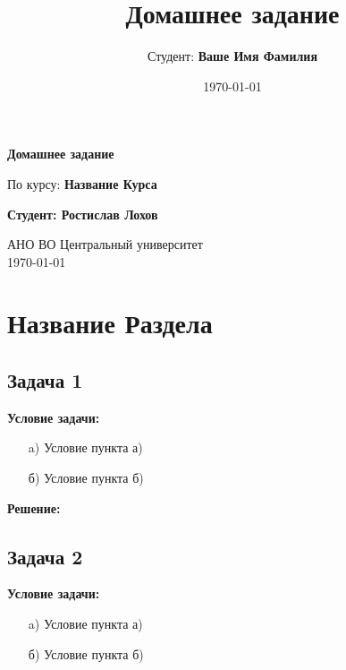 \documentclass[a4paper,12pt]{article}
\title{Домашнее задание}
\author{Студент: \textbf{Ваше Имя Фамилия}}
\date{\today}
\begin{document}
\begin{titlepage}
    \centering
    \vspace*{1cm}

    \Huge
    \textbf{Домашнее задание}

    \vspace{0.5cm}
    \LARGE
    По курсу: \textbf{Название Курса}

    \vspace{1.5cm}

    \textbf{Студент: Ростислав Лохов}

    \vfill

    \Large
    АНО ВО Центральный университет\\
    \vspace{0.3cm}
    \today

\end{titlepage}

\tableofcontents
\newpage

\section{Название Раздела}

\subsection{Задача 1}
\textbf{Условие задачи:}

\begin{itemize}
    \item[a)] Условие пункта а)
    \item[б)] Условие пункта б)
\end{itemize}

\textbf{Решение:}


\vspace{1cm}

\subsection{Задача 2}
\textbf{Условие задачи:}

\begin{itemize}
    \item[a)] Условие пункта а)
    \item[б)] Условие пункта б)
\end{itemize}
\end{document}
